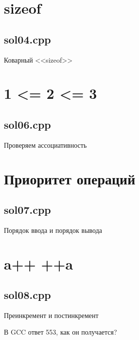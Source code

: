 \documentclass[mathserif,utf8,xcolor=table,11pt]{beamer}
\begin{document}
\section{sizeof}
\subsection{sol04.cpp}
\begin{frame}[t]{Коварный <<sizeof>>}
  

\end{frame}

\section{1 <= 2 <= 3}
\subsection{sol06.cpp}
\begin{frame}[t]{Проверяем ассоциативность}
  
\end{frame}

\section{Приоритет операций}
\subsection{sol07.cpp}
\begin{frame}[t]{Порядок ввода и порядок вывода}
  
\end{frame}

\section{a++ ++a}
\subsection{sol08.cpp}
\begin{frame}[t]{Преинкремент и постинкремент}
  
  
 В GCC ответ 553, как он получается?
\end{frame}

%
%  
\end{document}
